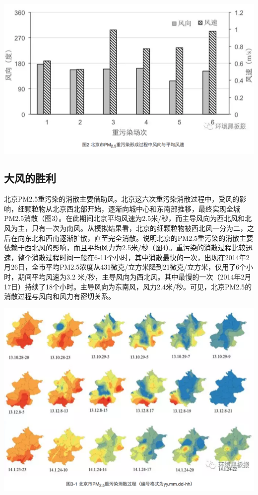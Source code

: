 \documentclass[]{book}
\begin{document}
\includegraphics[width=8.33in]{images/windhaze3}

\subsection{大风的胜利}

北京PM2.5重污染的消散主要借助风。北京这六次重污染消散过程中，受风的影响，细颗粒物从北京西北部开始，逐渐向城中心和东南部推移，最终实现全城PM2.5消散（图3）。在此期间北京平均风速为2.5米/秒，而主导风向为西北风和北风为主，只有一次为南风。从模拟结果看，北京的细颗粒物被西北风一分为二，之后在向东北和西南逐渐扩散，直至完全消散。说明北京的PM2.5重污染的消散主要依赖于西北风的影响，而且平均风力为2.5米/秒（图4）。重污染的消散过程比较迅速，整个消散过程时间一般在6-11个小时，其中消散最快的一次，出现在2014年2月26日，全市平均PM2.5浓度从431微克/立方米降到21微克/立方米，仅用了6个小时，期间平均风速为3.2
米/秒，主导风向为西北风。其中最慢的一次（2014年2月17日）持续了18个小时。主导风向为东南风，风力2.4米/秒。可见，北京PM2.5的消散过程与风向和风力有密切关系。

\includegraphics[width=8.33in]{images/windhaze4}
\end{document}
